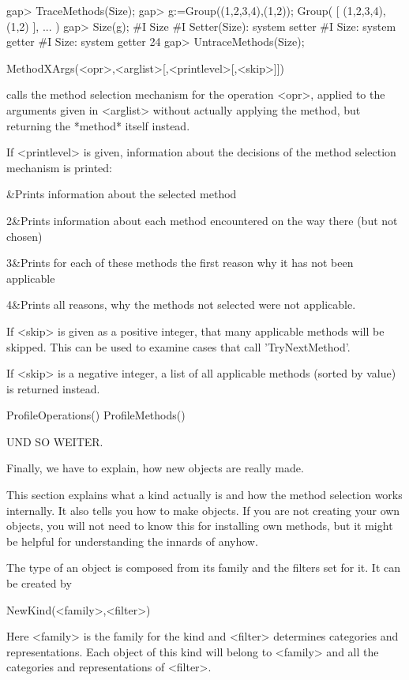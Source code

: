 \beginexample
gap> TraceMethods(Size);
gap> g:=Group((1,2,3,4),(1,2));
Group( [ (1,2,3,4), (1,2) ], ... )
gap> Size(g);
#I  Size
#I  Setter(Size): system setter
#I  Size: system getter
#I  Size: system getter
24
gap> UntraceMethods(Size);
\endexample

\>MethodXArgs(<opr>,<arglist>[,<printlevel>[,<skip>]])

calls the method selection mechanism for the operation <opr>, applied to the
arguments given in <arglist> without actually applying the method, but
returning the *method* itself instead.

If <printlevel> is given, information about
the decisions of the method selection mechanism is printed:

&Prints information about the selected method

2&Prints information about each method encountered on the way there (but not
chosen)

3&Prints for each of these methods the first reason why it has not been
applicable

4&Prints all reasons, why the methods not selected were not applicable.
\enditems

If <skip> is given as a positive integer, that many applicable  methods will
be skipped. This can be used to examine cases that call 'TryNextMethod'.

If <skip> is a negative integer, a list of all applicable methods (sorted by
value) is returned instead.

\>ProfileOperations()
\>ProfileMethods()

UND SO WEITER.



Finally, we have to explain, how new objects are really made.

This section explains what a kind actually is and how the method selection
works internally. It also tells you how to make objects.
If you are not creating your own objects, you will not need to know this
for installing own methods, but it might be helpful for understanding the
innards of {\GAP} anyhow.

The type of an object is composed from its family and the filters set for
it. It can be created by

\>NewKind(<family>,<filter>)

Here <family> is the family for the kind and <filter> determines categories
and representations. Each object of this kind will belong to <family> and
all the categories and representations of <filter>.


